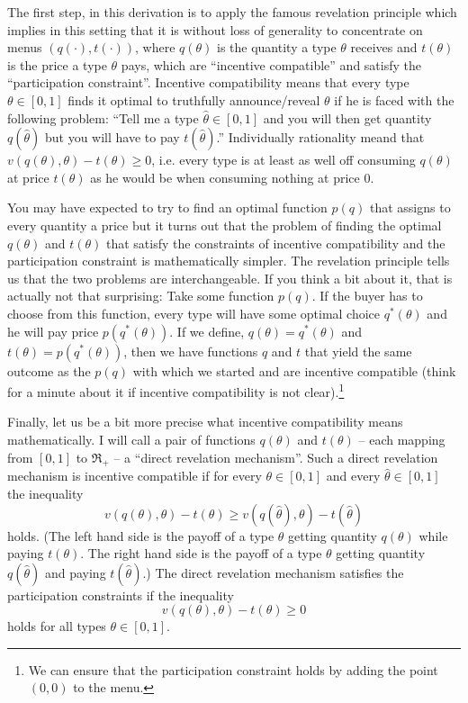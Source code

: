 \documentclass[12pt]{article}
\begin{document}
The first step, in this derivation is to apply the famous revelation principle which implies in this setting that it is without loss of generality to concentrate on menus $(q(\cdot),t(\cdot ))$, where $q(\theta )$ is the quantity a type $\theta $ receives and $t(\theta )$ is the price a type $\theta $ pays, which are ``incentive compatible'' and satisfy the ``participation constraint''. Incentive compatibility means that every type $\theta \in[0,1]$ finds it optimal to truthfully announce/reveal $\theta $ if he is faced with the following problem: ``Tell me a type $\hat{\theta }\in[0,1]$ and you will then get quantity $q(\hat{\theta })$ but you will have to pay $t(\hat{\theta })$.'' Individually rationality meand that $v(q(\theta ),\theta )-t(\theta )\geq 0$, i.e. every type is at least as well off consuming $q(\theta )$ at price $t(\theta )$ as he would be when consuming nothing at price 0.

You may have expected to try to find an optimal function $p(q)$ that assigns to every quantity a price but it turns out that the problem of finding the optimal $q(\theta )$ and $t(\theta )$ that satisfy the constraints of incentive compatibility and the participation constraint is mathematically simpler. The revelation principle tells us that the two problems are interchangeable. If you think a bit about it, that is actually not that surprising: Take some function $p(q)$. If the buyer has to choose from this function, every type will have some optimal choice $q^*(\theta )$ and he will pay price $p(q^*(\theta ))$. If we define, $q(\theta )=q^*(\theta )$ and $t(\theta ) = p(q^*(\theta ))$, then we have functions $q$ and $t$ that yield the same outcome as the $p(q)$ with which we started and are incentive compatible (think for a minute about it if incentive compatibility is not clear).\footnote{We can ensure that the participation constraint holds by adding the point $(0,0)$ to the menu.}

Finally, let us be a bit more precise what incentive compatibility means mathematically. I will call a pair of functions $q(\theta )$ and $t(\theta )$ -- each mapping from $[0,1]$ to $\Re_+$ -- a ``direct revelation mechanism''. Such a direct revelation mechanism is incentive compatible if for every $\theta \in[0,1]$ and every $\hat\theta\in[0,1]$ the inequality
$$v(q(\theta ),\theta )-t(\theta )\geq v(q(\hat\theta ),\theta )-t(\hat\theta)$$
holds. (The left hand side is the payoff of a type $\theta $ getting quantity $q(\theta )$ while paying $t(\theta )$. The right hand side is the payoff of a type $\theta $ getting quantity $q(\hat{\theta })$ and paying $t(\hat{\theta })$.) The direct revelation mechanism satisfies the participation constraints if the inequality
$$v(q(\theta ),\theta )-t(\theta )\geq 0$$
holds for all types $\theta \in[0,1]$.
\end{document}

